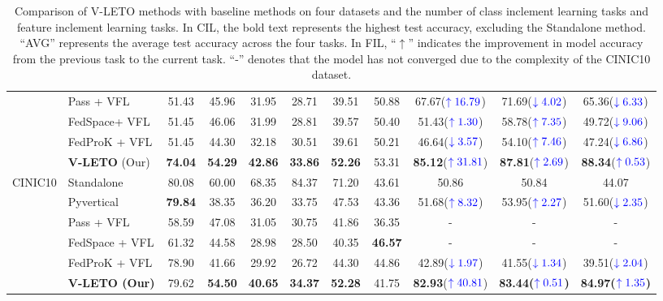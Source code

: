 \begin{table*}[!t]
\begin{tabular}{clccccc|cccc}
&Pass + VFL             & 51.43     & 45.96  & 31.95 & 28.71& 39.51 &50.88   &67.67(${\color{blue}\uparrow16.79}$)  &71.69(${\color{blue}\downarrow4.02}$)  & 65.36(${\color{blue}\downarrow6.33}$)\\
& FedSpace+ VFL            & 51.45     & 46.06   & 31.99 & 28.81  & 39.57 & 50.40  &51.43(${\color{blue}\uparrow1.30}$)  & 58.78(${\color{blue}\uparrow7.35}$) &49.72(${\color{blue}\downarrow9.06}$) \\
&FedProK + VFL          & 51.45    & 44.30   & 32.18 & 30.51 & 39.61 &50.21   &46.64(${\color{blue}\downarrow3.57}$)  & 54.10(${\color{blue}\uparrow7.46}$) &47.24(${\color{blue}\downarrow6.86}$) \\
& \textbf{V-LETO} (Our)           & \textbf{74.04}      & \textbf{54.29} & \textbf{42.86}  & \textbf{33.86 } &  \textbf{52.26} & 53.31 & \textbf{85.12}(${\color{blue}\uparrow31.81}$)  & \textbf{87.81}(${\color{blue}\uparrow2.69}$) &  \textbf{88.34}(${\color{blue}\uparrow0.53}$) \\
\midrule
\multirow{6}{*}{CINIC10} & Standalone  & 80.08    & 60.00 &  68.35 & 84.37  & 71.20& 43.61& 50.86   &  50.84   &44.07 \\
& Pyvertical  &  \textbf{79.84} & 38.35    & 36.20 &33.75 & 47.53  &43.36    & 51.68(${\color{blue}\uparrow8.32}$) &53.95(${\color{blue}\uparrow2.27}$)  & 51.60(${\color{blue}\downarrow2.35}$)    \\
&Pass + VFL     &58.59       & 47.08    &31.05  &30.75   & 41.86 & 36.35 &-  &-  &-  \\
& FedSpace + VFL  &61.32       &44.58     &28.98  &28.50   &40.35  & \textbf{46.57}  &  - & -  & -\\
&FedProK + VFL  &78.90       & 41.66    &29.92   &26.72   &44.30 & 44.86    & 42.89(${\color{blue}\downarrow1.97}$)   & 41.55(${\color{blue}\downarrow1.34}$)  &39.51(${\color{blue}\downarrow2.04}$)  \\
& \textbf{V-LETO (Our)}           & 79.62 & \textbf{54.50}  &\textbf{40.65} & \textbf{34.37} &\textbf{52.28} & 41.75  & \textbf{82.93}(${\color{blue}\uparrow40.81}$)&  \textbf{83.44}\textbf{(${\color{blue}\uparrow0.51}$)}&\textbf{84.97}\textbf{(${\color{blue}\uparrow1.35}$)} \\
\bottomrule
\end{tabular}
\caption{Comparison of V-LETO methods with baseline methods on four datasets and the number of class inclement learning tasks and feature inclement learning tasks.
In CIL, the bold text represents the highest test accuracy, excluding the Standalone method. ``AVG'' represents the average test accuracy across the four tasks. 
In FIL, ``$\uparrow$'' indicates the improvement in model accuracy from the previous task to the current task. ``-'' denotes that the model has not converged due to the complexity of the CINIC10 dataset.
} 
\label{table: V-LETO}
\end{table*}


